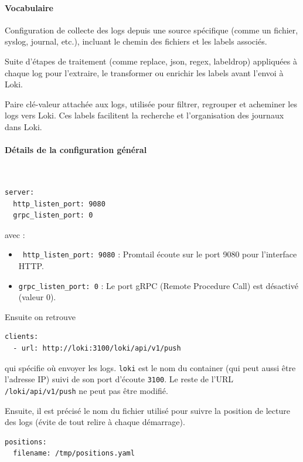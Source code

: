 \documentclass[french, 12pt]{article}%
\newcommand{\itemE}{\item[$\bullet$]}
\newcommand{\titreencadre}{Titre}
\newenvironment{encadre}[1]{\renewcommand{\titreencadre}{#1}
	\begin{mdframed}[style=encadrestyle]
	\vspace{0.5\baselineskip}
	}{%
	\end{mdframed}}
\begin{document}
\paragraph{Vocabulaire }
\begin{encadre}{Job dans Promtail}
Configuration de collecte des logs depuis une source spécifique (comme un fichier, syslog, journal, etc.), incluant le chemin des fichiers et les labels associés.
\end{encadre}

\begin{encadre}{Piepline dans Promtail}
Suite d'étapes de traitement (comme replace, json, regex, labeldrop) appliquées à chaque log pour l’extraire, le transformer ou enrichir les labels avant l’envoi à Loki.
\end{encadre}


\begin{encadre}{Label dans Promtail}
Paire clé-valeur attachée aux logs, utilisée pour filtrer, regrouper et acheminer les logs vers Loki. Ces labels facilitent la recherche et l'organisation des journaux dans Loki.
\end{encadre}


\paragraph{Détails de la configuration général}\ 



\begin{lstlisting}[style=commande]
server:
  http_listen_port: 9080
  grpc_listen_port: 0
\end{lstlisting}
avec : 
\begin{itemize}
\itemE  \verb? http_listen_port: 9080? : Promtail écoute sur le port 9080 pour l'interface HTTP.
\itemE  \verb?grpc_listen_port: 0? : Le port gRPC (Remote Procedure Call) est désactivé (valeur 0).
\end{itemize}

Ensuite on retrouve 
\begin{lstlisting}[style=commande]
clients:
  - url: http://loki:3100/loki/api/v1/push
\end{lstlisting}
qui spécifie où envoyer les logs. \verb?loki? est le nom du container (qui peut aussi être l'adresse IP) suivi de son port d'écoute \verb?3100?. Le reste de l'URL \verb?/loki/api/v1/push? ne peut pas être modifié.


Ensuite, il est précisé le nom du fichier utilisé pour suivre la position de lecture des logs (évite de tout relire à chaque démarrage).
\begin{lstlisting}[style=commande]
positions:
  filename: /tmp/positions.yaml
\end{lstlisting}
\end{document}
